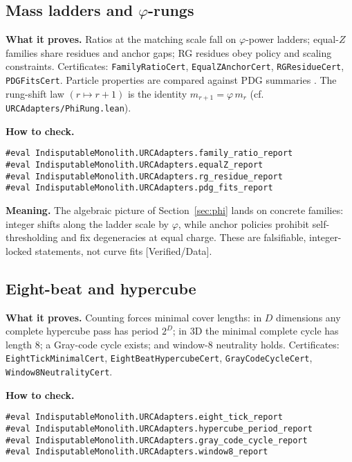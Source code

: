 \documentclass[11pt,a4paper,twoside]{article}
\numberwithin{equation}{section}
\newcommand{\phigr}{\varphi} %
\theoremstyle{customthm}
\theoremstyle{customdef}
\theoremstyle{customrem}
\begin{document}
\subsection{Mass ladders and $\phigr$-rungs}

\textbf{What it proves.} Ratios at the matching scale fall on $\phigr$-power ladders; equal-$Z$ families share residues and anchor gaps; RG residues obey policy and scaling constraints. Certificates: \texttt{FamilyRatioCert}, \texttt{EqualZAnchorCert}, \texttt{RGResidueCert}, \texttt{PDGFitsCert}. Particle properties are compared against PDG summaries \citep{PDG2024}. The rung-shift law \((r \mapsto r+1)\) is the identity
\(m_{r+1}=\phigr\,m_r\) (cf. \texttt{URCAdapters/PhiRung.lean}).

\textbf{How to check.}

\begin{lstlisting}
#eval IndisputableMonolith.URCAdapters.family_ratio_report
#eval IndisputableMonolith.URCAdapters.equalZ_report
#eval IndisputableMonolith.URCAdapters.rg_residue_report
#eval IndisputableMonolith.URCAdapters.pdg_fits_report
\end{lstlisting}

\textbf{Meaning.} The algebraic picture of Section~\ref{sec:phi} lands on concrete families: integer shifts along the ladder scale by $\phigr$, while anchor policies prohibit self-thresholding and fix degeneracies at equal charge. These are falsifiable, integer-locked statements, not curve fits [Verified/Data].

\subsection{Eight-beat and hypercube}

\textbf{What it proves.} Counting forces minimal cover lengths: in $D$ dimensions any complete hypercube pass has period $2^D$; in $3$D the minimal complete cycle has length $8$; a Gray-code cycle exists; and window-8 neutrality holds. Certificates: \texttt{EightTickMinimalCert}, \texttt{EightBeatHypercubeCert}, \texttt{GrayCodeCycleCert}, \texttt{Window8NeutralityCert}.

\textbf{How to check.}

\begin{lstlisting}
#eval IndisputableMonolith.URCAdapters.eight_tick_report
#eval IndisputableMonolith.URCAdapters.hypercube_period_report
#eval IndisputableMonolith.URCAdapters.gray_code_cycle_report
#eval IndisputableMonolith.URCAdapters.window8_report
\end{lstlisting}
\end{document}
